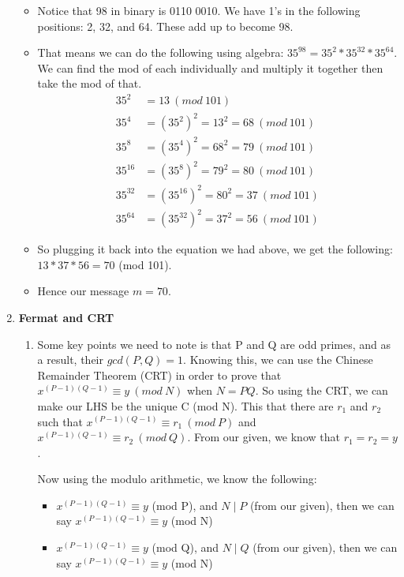 \documentclass[12pt,fleqn]{article}
\begin{document}
\begin{enumerate}
  \begin{itemize}
  	\item Notice that 98 in binary is 0110 0010. We have 1's in the following positions: 2, 32, and 64. These add up to become 98. 
  	\item That means we can do the following using algebra: $35^{98} = 35^{2} * 35^{32} * 35^{64}$. We can find the mod of each individually and multiply it together then take the mod of that.
  	\begin{align*} 
	35^{2} &= 13 \: (mod \: 101) \\
	35^{4} &= (35^{2})^{2} = 13^2 = 68 \: (mod \: 101) \\
	35^{8} &= (35^{4})^{2} = 68^2 = 79 \: (mod \: 101) \\
	35^{16} &= (35^{8})^{2} = 79^2 = 80 \: (mod \: 101) \\
	35^{32} &= (35^{16})^{2} = 80^2 = 37 \: (mod \: 101) \\
	35^{64} &= (35^{32})^{2} = 37^2 = 56 \: (mod \: 101) 
  \end{align*} 
  \item So plugging it back into the equation we had above, we get the following: $13 * 37 * 56 = 70$ (mod 101).
  \item Hence our message $m = 70$. 
  \end{itemize}
  
  \newpage
  \item \textbf{Fermat and CRT}

  \begin{enumerate}
    \item 
    Some key points we need to note is that P and Q are odd primes, and as a result, their $gcd(P,Q) = 1$. Knowing this, we can use the Chinese Remainder Theorem (CRT) in order to prove that $x^{(P - 1)(Q - 1)} \equiv y \: (mod \: N)$ when $N = PQ$. So using the CRT, we can make our LHS be the unique C (mod N). This that there are $r_1$ and $r_2$ such that $x^{(P - 1)(Q - 1)} \equiv r_1 \: (mod \: P)$ and $x^{(P - 1)(Q - 1)} \equiv r_2 \: (mod \: Q)$. From our given, we know that $r_1 = r_2 = y$.
    
    Now using the modulo arithmetic, we know the following: 
    
    \begin{itemize}
    		\item $x^{(P - 1)(Q - 1)}  \equiv y$ (mod P), and $N \mid P$ (from our given), then we can say $x^{(P - 1)(Q - 1)}  \equiv y$ (mod N)
    		\item $x^{(P - 1)(Q - 1)}  \equiv y$ (mod Q), and $N \mid Q$ (from our given), then we can say $x^{(P - 1)(Q - 1)}  \equiv y$ (mod N)
    \end{itemize}
    

\end{enumerate}
\end{enumerate}
\end{document}
